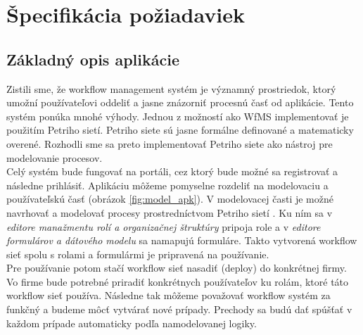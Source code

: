 


\section{Špecifikácia požiadaviek}

\subsection{Základný opis aplikácie}
Zistili sme, že workflow management systém je významný prostriedok, ktorý umožní používateľovi oddeliť a jasne znázorniť procesnú časť od aplikácie. Tento systém ponúka mnohé výhody. Jednou z možností ako WfMS implementovať je použitím Petriho sietí. Petriho siete sú jasne formálne definované a matematicky overené.  Rozhodli sme sa preto implementovať Petriho siete ako nástroj pre modelovanie procesov.\\

Celý systém bude fungovať na portáli, cez ktorý bude možné sa registrovať a následne prihlásiť. Aplikáciu môžeme pomyselne rozdeliť na modelovaciu a používateľskú časť (obrázok \ref{fig:model_apk}). V modelovacej časti je možné navrhovať a modelovať procesy prostredníctvom Petriho sietí . Ku ním sa v \emph{editore manažmentu rolí a organizačnej štruktúry} pripoja role a v \emph{editore formulárov a dátového modelu} sa namapujú formuláre. Takto vytvorená workflow sieť spolu s rolami a formulármi je pripravená na používanie. \\

Pre používanie potom stačí workflow sieť nasadiť (deploy) do konkrétnej firmy. Vo firme bude potrebné priradiť konkrétnych používateľov ku rolám, ktoré táto workflow sieť používa. Následne tak môžeme považovať workflow systém za funkčný a budeme môcť vytvárať nové prípady. Prechody sa budú dať spúšťať v každom prípade  automaticky podľa namodelovanej logiky.

